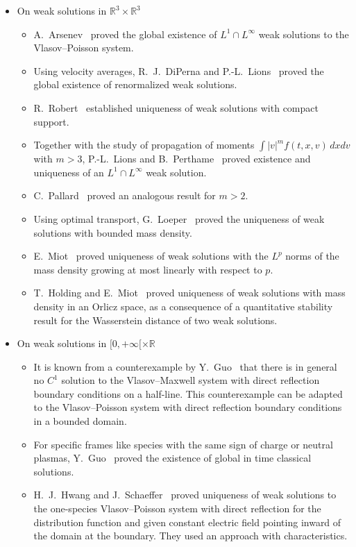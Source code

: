 \documentclass[10pt]{amsart}
\theoremstyle{definition}\newtheorem{defi}[theo]{Definition}\newtheorem{rema}[theo]{Remark}\newtheorem{exam}[theo]{Example}\newtheorem{exem}[theo]{Example}\newtheorem{nota}[theo]{Notation}
\newcommand{\R}{\mathbb{R}}
\begin{document}
\begin{itemize}
\item On weak solutions in $\R ^3\times \R ^3$
\begin{itemize}
\item[-] A.~Arsenev~\cite{Ars75} proved the global existence of $L^1\cap L^\infty $ weak solutions to the Vlasov--Poisson system.
\item[-] Using velocity averages, R.~J.~DiPerna and P.-L.~Lions~\cite{DL88} proved the global existence of renormalized weak solutions.
\item[-] R.~Robert~\cite{Rob97} established uniqueness of weak solutions with compact support.
\item[-] Together with the study of propagation of moments $\int |v|^m f(t,x,v) \, dx dv$ with $m>3$, P.-L.~Lions and B.~Perthame~\cite{LP91} proved existence and uniqueness of an $L^1 \cap L^{\infty}$ weak solution. 
\item[-] C.~Pallard~\cite{Pal12} proved an analogous result for $m>2$.
\item[-] Using optimal transport, G.~Loeper~\cite{Loe06} proved the uniqueness of weak solutions with bounded mass density.
\item[-] E.~Miot~\cite{Mio16} proved uniqueness of weak solutions with the $L^p$ norms of the mass density growing at most linearly with respect to $p$.
\item[-] T.~Holding and E.~Miot~\cite{HM18} proved uniqueness of weak solutions with mass density in an Orlicz space, as a consequence of a quantitative stability result for the Wasserstein distance of two weak solutions.
\end{itemize}
\vspace{4pt}
\item On weak solutions in $[0,+\infty [\times \R $
\begin{itemize}
\item[-] It is known from a counterexample by Y.~Guo~\cite{Guo95} that there is in general no $C^1$ solution to the Vlasov--Maxwell system with direct reflection boundary conditions on a half-line. This counterexample can be adapted to the Vlasov--Poisson system with direct reflection boundary conditions in a bounded domain.
\item[-] For specific frames like species with the same sign of charge or neutral plasmas, Y.~Guo~\cite{Guo94} proved the existence of global in time classical solutions.
\item[-] H.~J.~Hwang and J.~Schaeffer~\cite{HS08} proved uniqueness of weak solutions to the one-species Vlasov--Poisson system with direct reflection for the distribution function and given constant electric field pointing inward of the domain at the boundary. They used an approach with characteristics.

\end{itemize}
\end{itemize}
\end{document}
